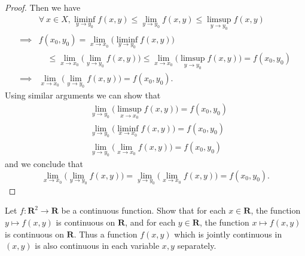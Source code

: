 \begin{proof}
    Then we have
    \begin{align*}
                 & \forall\ x \in X, \liminf_{y \to y_0} f(x, y) \leq \lim_{y \to y_0} f(x, y) \leq \limsup_{y \to y_0} f(x, y)                             \\
        \implies & f(x_0, y_0) = \lim_{x \to x_0} \big(\liminf_{y \to y_0} f(x, y)\big)                                                                     \\
                 & \quad \leq \lim_{x \to x_0} \big(\lim_{y \to y_0} f(x, y)\big) \leq \lim_{x \to x_0} \big(\limsup_{y \to y_0} f(x, y)\big) = f(x_0, y_0) \\
        \implies & \lim_{x \to x_0} \big(\lim_{y \to y_0} f(x, y)\big) = f(x_0, y_0).
    \end{align*}
    Using similar arguments we can show that
    \begin{align*}
         & \lim_{y \to y_0} \big(\limsup_{x \to x_0} f(x, y)\big) = f(x_0, y_0) \\
         & \lim_{y \to y_0} \big(\liminf_{x \to x_0} f(x, y)\big) = f(x_0, y_0) \\
         & \lim_{y \to y_0} \big(\lim_{x \to x_0} f(x, y)\big) = f(x_0, y_0)
    \end{align*}
    and we conclude that
    \[
        \lim_{x \to x_0} \big(\lim_{y \to y_0} f(x, y)\big) = \lim_{y \to y_0} \big(\lim_{x \to x_0} f(x, y)\big) = f(x_0, y_0).
    \]
\end{proof}

\begin{exercise}\label{ex 2.2.10}
    Let \(f : \mathbf{R}^2 \to \mathbf{R}\) be a continuous function.
    Show that for each \(x \in \mathbf{R}\), the function \(y \mapsto f(x, y)\) is continuous on \(\mathbf{R}\), and for each \(y \in \mathbf{R}\), the function \(x \mapsto f(x, y)\) is continuous on \(\mathbf{R}\).
    Thus a function \(f(x, y)\) which is jointly continuous in \((x, y)\) is also continuous in each variable \(x, y\) separately.
\end{exercise}

